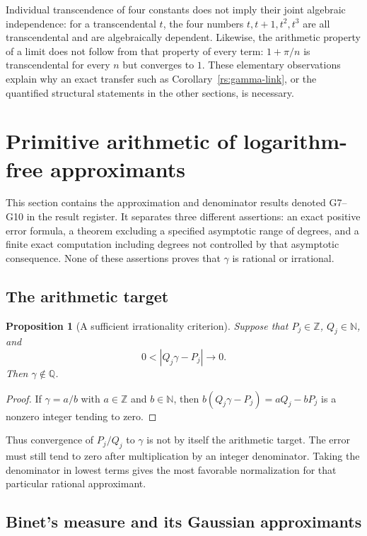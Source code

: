 \documentclass[11pt,a4paper]{article}
\numberwithin{equation}{section}
\newtheorem{proposition}[theorem]{Proposition}
\theoremstyle{definition}
\theoremstyle{remark}
\newcommand{\Q}{\mathbb Q}
\newcommand{\Z}{\mathbb Z}
\newcommand{\N}{\mathbb N}
\begin{document}
Individual transcendence of four constants does not imply their joint
algebraic independence: for a transcendental $t$, the four numbers
$t,t+1,t^2,t^3$ are all transcendental and are algebraically dependent.
Likewise, the arithmetic property of a limit does not follow from that
property of every term: $1+\pi/n$ is transcendental for every $n$ but
converges to $1$.  These elementary observations explain why an exact
transfer such as Corollary~\ref{rs:gamma-link}, or the quantified
structural statements in the other sections, is necessary.

\section{Primitive arithmetic of logarithm-free approximants}
\label{ga:section}

This section contains the approximation and denominator results denoted
G7--G10 in the result register.  It separates three different assertions:
an exact positive error formula, a theorem excluding a specified
asymptotic range of degrees, and a finite exact computation including degrees not controlled by that
asymptotic consequence.  None of these assertions proves that $\gamma$ is rational or
irrational.

\subsection{The arithmetic target}
\label{ga:target}

\begin{proposition}[A sufficient irrationality criterion]
\label{ga:irrationality}
Suppose that $P_j\in\Z$, $Q_j\in\N$, and
\[
             0<|Q_j\gamma-P_j|\longrightarrow0.
\]
Then $\gamma\notin\Q$.
\end{proposition}
\begin{proof}
If $\gamma=a/b$ with $a\in\Z$ and $b\in\N$, then
$b(Q_j\gamma-P_j)=aQ_j-bP_j$ is a nonzero integer tending to zero.
\end{proof}

Thus convergence of $P_j/Q_j$ to $\gamma$ is not by itself the
arithmetic target.  The error must still tend to zero after multiplication
by an integer denominator.  Taking the denominator in lowest terms gives
the most favorable normalization for that particular rational
approximant.

\subsection{Binet's measure and its Gaussian approximants}
\label{ga:binet}
\end{document}
